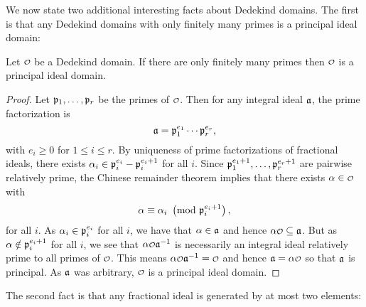     We now state two additional interesting facts about Dedekind domains. The first is that any Dedekind domains with only finitely many primes is a principal ideal domain:

    \begin{proposition}\label{prop:Dedekind_with_finite_primes_is_PID}
      Let $\smc{O}$ be a Dedekind domain. If there are only finitely many primes then $\smc{O}$ is a principal ideal domain.
    \end{proposition}
    \begin{proof}
      Let $\mathfrak{p}_{1},\ldots,\mathfrak{p}_{r}$ be the primes of $\smc{O}$. Then for any integral ideal $\mathfrak{a}$, the prime factorization is
      \[
        \mathfrak{a} = \mathfrak{p}_{1}^{e_{1}} \cdots \mathfrak{p}_{r}^{e_{r}},
      \]
      with $e_{i} \ge 0$ for $1 \le i \le r$. By uniqueness of prime factorizations of fractional ideals, there exists $\alpha_{i} \in \mathfrak{p}_{i}^{e_{i}}-\mathfrak{p}_{i}^{e_{i}+1}$ for all $i$. Since $\mathfrak{p}_{1}^{e_{1}+1},\ldots,\mathfrak{p}_{r}^{e_{r}+1}$ are pairwise relatively prime, the Chinese remainder theorem implies that there exists $\a \in \smc{O}$ with 
      \[
        \alpha \equiv \alpha_{i} \ \left(\text{mod }\mathfrak{p}_{i}^{e_{i}+1}\right),
      \]
      for all $i$. As $\alpha_{i} \in \mathfrak{p}_{i}^{e_{i}}$ for all $i$, we have that $\alpha \in \mathfrak{a}$ and hence $\a\smc{O} \subseteq \mf{a}$. But as $\alpha \notin \mathfrak{p}_{i}^{e_{i}+1}$ for all $i$, we see that $\a\smc{O}\mf{a}^{-1}$ is necessarily an integral ideal relatively prime to all primes of $\smc{O}$. This means $\a\smc{O}\mf{a}^{-1} = \smc{O}$ and hence $\mf{a} = \a\smc{O}$ so that $\mathfrak{a}$ is principal. As $\mathfrak{a}$ was arbitrary, $\smc{O}$ is a principal ideal domain.
    \end{proof}
    
    The second fact is that any fractional ideal is generated by at most two elements:

